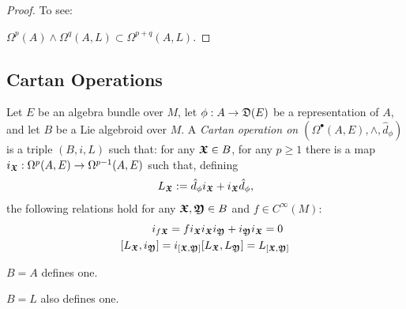 \begin{proof}
To see:

$\Omega^p(A) \wedge \Omega^q(A, L) \subset \Omega^{p+q}(A, L)$.
\end{proof}
\subsection{Cartan Operations}





\begin{definition}
Let $E$ be an algebra bundle over $M$, let $\phi: A \to \alg D(E)$ be a representation of $A$, and let $B$ be a Lie algebroid over $M$. A \emph{Cartan operation on $(\Omega^\bullet(A, E), \wedge, \hat d_\phi)$} is a triple $(B, i, L)$ such that: for any $\bm{\mathfrak{X}} \in B$, for any $p \geq 1$ there is a map $i_{\bm{\mathfrak{X}}}: \Omega^p(A, E) \to \Omega^{p-1}(A, E)$ such that, defining 
\begin{align}
L_{\sectoid X} := \hat d_\phi i_{\sectoid X} + i_{\sectoid X}\hat d_\phi,
\end{align}
the following relations hold for any $\bm{\mathfrak{X}}, \bm{\mathfrak{Y}} \in B$ and $f \in C^\infty(M)$:
\begin{align}
    i_{f \sectoid X} = f i_{\sectoid X} & i_{\sectoid X} i_{\sectoid Y} + i_{\sectoid Y} i_{\sectoid X} = 0 \\
    [L_{\sectoid X}, i_{\sectoid Y}] = i_{[\sectoid X, \sectoid Y]} & [L_{\sectoid X}, L_{\sectoid Y}] = L_{[\sectoid X, \sectoid Y]}
\end{align}
\end{definition}

\begin{example}
$B = A$ defines one.
\end{example}

\begin{example}
$B = L$ also defines one.
\end{example}

